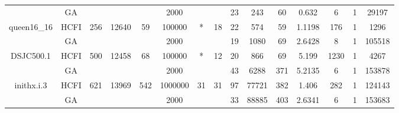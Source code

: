 \documentclass[10pt]{article}
\begin{document}
\begin{center}
\begin{table}[H]
\begin{tabular}{|c|c|c|c|c|c|c|c|c|c|c|c|c|c|c|}
	&GA&       &                   &                     &  2000       &     \cellcolor{yellow} & {\cellcolor{yellow}}& {{\cellcolor{green}23}}
&243   &60        &0.632                   &6                    &1          &29197        \\ \cline{2-2} \cline{6-6} \cline{9-15}
 \multirow{-2}{*}{queen16\_16} &HCFI   &\multirow{-2}{*}{256}   &\multirow{-2}{*}{12640}     &\multirow{-2}{*}{59}     &100000     &\multirow{-2}{*}{\cellcolor{yellow}*}      & \multirow{-2}{*}{\cellcolor{yellow}18}    &{\cellcolor{green}22}     &574         &59    &1.1198         &176    &1     &1296        \\ \hline \hline
	&GA&       &                   &                     &   2000      &     \cellcolor{yellow} & {\cellcolor{yellow}}& {{\cellcolor{green}19}}
&1080   &69        &2.6428                   &8                    & 1         &105518        \\ \cline{2-2} \cline{6-6} \cline{9-15}
 \multirow{-2}{*}{DSJC500.1} &HCFI   &\multirow{-2}{*}{500}   &\multirow{-2}{*}{12458}     &\multirow{-2}{*}{68}     &100000     &\multirow{-2}{*}{\cellcolor{yellow}*}      & \multirow{-2}{*}{\cellcolor{yellow}12}    &{\cellcolor{green}20}     &866         &69    &5.199         &1230    &1     &4267        \\ \hline \hline
	&GA&       &                   &                     &   2000      &     \cellcolor{yellow} & {\cellcolor{yellow}}& {{\cellcolor{green}43}}
&6288   &371        & 5.2135                  & 6                   &  1        &  153878      \\ \cline{2-2} \cline{6-6} \cline{9-15}
 \multirow{-2}{*}{inithx.i.3} &HCFI   &\multirow{-2}{*}{621}   &\multirow{-2}{*}{13969}     &\multirow{-2}{*}{542}     &1000000     &\multirow{-2}{*}{\cellcolor{yellow}31}      & \multirow{-2}{*}{\cellcolor{yellow}31}    &{\cellcolor{green}97}     &77721         &382    &1.406         &282    &1     &124143        \\ \hline \hline
	&GA&       &                   &                     &   2000     &     \cellcolor{yellow} & {\cellcolor{yellow}}& {{\cellcolor{green}33}}
&88885   &403        &2.6341                    &6                    &1          &153683         \\ \cline{2-2} \cline{6-6} \cline{9-15}

\end{tabular}
\end{table}
\end{center}
\end{document}

